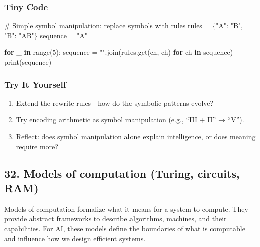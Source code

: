 \documentclass[
  letterpaper,
  DIV=11,
  numbers=noendperiod]{scrreprt}
\newenvironment{Shaded}{\begin{snugshade}}{\end{snugshade}}
\newcommand{\BuiltInTok}[1]{\textcolor[rgb]{0.00,0.23,0.31}{#1}}
\newcommand{\CommentTok}[1]{\textcolor[rgb]{0.37,0.37,0.37}{#1}}
\newcommand{\ControlFlowTok}[1]{\textcolor[rgb]{0.00,0.23,0.31}{\textbf{#1}}}
\newcommand{\DecValTok}[1]{\textcolor[rgb]{0.68,0.00,0.00}{#1}}
\newcommand{\KeywordTok}[1]{\textcolor[rgb]{0.00,0.23,0.31}{\textbf{#1}}}
\newcommand{\NormalTok}[1]{\textcolor[rgb]{0.00,0.23,0.31}{#1}}
\newcommand{\OperatorTok}[1]{\textcolor[rgb]{0.37,0.37,0.37}{#1}}
\newcommand{\StringTok}[1]{\textcolor[rgb]{0.13,0.47,0.30}{#1}}
\providecommand{\tightlist}{%
  \setlength{\itemsep}{0pt}\setlength{\parskip}{0pt}}
\begin{document}
\subsubsection{Tiny Code}\label{tiny-code-30}

\begin{Shaded}
\begin{Highlighting}[]
\CommentTok{\# Simple symbol manipulation: replace symbols with rules}
\NormalTok{rules }\OperatorTok{=}\NormalTok{ \{}\StringTok{"A"}\NormalTok{: }\StringTok{"B"}\NormalTok{, }\StringTok{"B"}\NormalTok{: }\StringTok{"AB"}\NormalTok{\}}
\NormalTok{sequence }\OperatorTok{=} \StringTok{"A"}

\ControlFlowTok{for}\NormalTok{ \_ }\KeywordTok{in} \BuiltInTok{range}\NormalTok{(}\DecValTok{5}\NormalTok{):}
\NormalTok{    sequence }\OperatorTok{=} \StringTok{""}\NormalTok{.join(rules.get(ch, ch) }\ControlFlowTok{for}\NormalTok{ ch }\KeywordTok{in}\NormalTok{ sequence)}
    \BuiltInTok{print}\NormalTok{(sequence)}
\end{Highlighting}
\end{Shaded}

\subsubsection{Try It Yourself}\label{try-it-yourself-30}

\begin{enumerate}
\def\labelenumi{\arabic{enumi}.}
\tightlist
\item
  Extend the rewrite rules---how do the symbolic patterns evolve?
\item
  Try encoding arithmetic as symbol manipulation (e.g., ``III + II'' →
  ``V'').
\item
  Reflect: does symbol manipulation alone explain intelligence, or does
  meaning require more?
\end{enumerate}

\subsection{32. Models of computation (Turing, circuits,
RAM)}\label{models-of-computation-turing-circuits-ram}

Models of computation formalize what it means for a system to compute.
They provide abstract frameworks to describe algorithms, machines, and
their capabilities. For AI, these models define the boundaries of what
is computable and influence how we design efficient systems.
\end{document}
